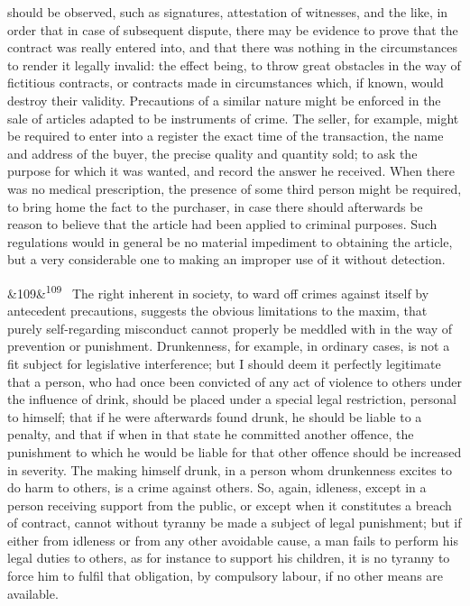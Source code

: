 \documentclass[12pt]{article}
\newcommand{\para}[1][]{\par\noindent\ifx&#1&\else\textsuperscript{\footnotesize #1}~\fi}
\begin{document}
should be observed, such as signatures, attestation of witnesses, and the like, in order that in case of subsequent dispute, there may be evidence to prove that the contract was really entered into, and that there was nothing in the circumstances to render it legally invalid: the effect being, to throw great obstacles in the way of fictitious contracts, or contracts made in circumstances which, if known, would destroy their validity. Precautions of a similar nature might be enforced in the sale of articles adapted to be instruments of crime. The seller, for example, might be required to enter into a register the exact time of the transaction, the name and address of the buyer, the precise quality and quantity sold; to ask the purpose for which it was wanted, and record the answer he received. When there was no medical prescription, the presence of some third person might be required, to bring home the fact to the purchaser, in case there should afterwards be reason to believe that the article had been applied to criminal purposes. Such regulations would in general be no material impediment to obtaining the article, but a very considerable one to making an improper use of it without detection.

\para[109] The right inherent in society, to ward off crimes against itself by antecedent precautions, suggests the obvious limitations to the maxim, that purely self-regarding misconduct cannot properly be meddled with in the way of prevention or punishment. Drunkenness, for example, in ordinary cases, is not a fit subject for legislative interference; but I should deem it perfectly legitimate that a person, who had once been convicted of any act of violence to others under the influence of drink, should be placed under a special legal restriction, personal to himself; that if he were afterwards found drunk, he should be liable to a penalty, and that if when in that state he committed another offence, the punishment to which he would be liable for that other offence should be increased in severity. The making himself drunk, in a person whom drunkenness excites to do harm to others, is a crime against others. So, again, idleness, except in a person receiving support from the public, or except when it constitutes a breach of contract, cannot without tyranny be made a subject of legal punishment; but if either from idleness or from any other avoidable cause, a man fails to perform his legal duties to others, as for instance to support his children, it is no tyranny to force him to fulfil that obligation, by compulsory labour, if no other means are available.
\end{document}

